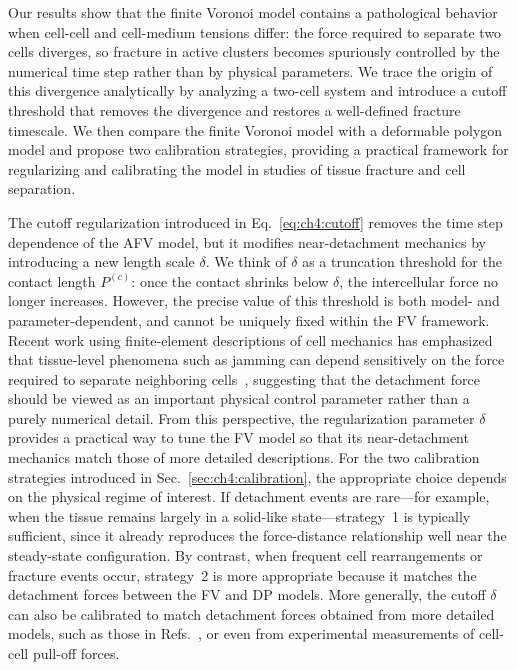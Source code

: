 Our results show that the finite Voronoi model contains a pathological behavior when cell-cell and cell-medium tensions differ: the force required to separate two cells diverges, so fracture in active clusters becomes spuriously controlled by the numerical time step rather than by physical parameters.
We trace the origin of this divergence analytically by analyzing a two-cell system and introduce a cutoff threshold that removes the divergence and restores a well-defined fracture timescale. We then compare the finite Voronoi model with a deformable polygon model and propose two calibration strategies, providing a practical framework for regularizing and calibrating the model in studies of tissue fracture and cell separation.

The cutoff regularization introduced in Eq.~\eqref{eq:ch4:cutoff} removes the time step dependence of the AFV model, but it modifies near-detachment mechanics by introducing a new length scale $\delta$.
We think of $\delta$ as a truncation threshold for the contact length $P^{(c)}$: once the contact shrinks below $\delta$, the intercellular force no longer increases.
However, the precise value of this threshold is both model- and parameter-dependent, and cannot be uniquely fixed within the FV framework.
Recent work using finite-element descriptions of cell mechanics has emphasized that tissue-level phenomena such as jamming can depend sensitively on the force required to separate neighboring cells~\cite{vangheel2026rigidity}, suggesting that the detachment force should be viewed as an important physical control parameter rather than a purely numerical detail.
From this perspective, the regularization parameter $\delta$ provides a practical way to tune the FV model so that its near-detachment mechanics match those of more detailed descriptions.
For the two calibration strategies introduced in Sec.~\ref{sec:ch4:calibration}, the appropriate choice depends on the physical regime of interest.
If detachment events are rare---for example, when the tissue remains largely in a solid-like state---strategy~1 is typically sufficient, since it already reproduces the force-distance relationship well near the steady-state configuration.
By contrast, when frequent cell rearrangements or fracture events occur, strategy~2 is more appropriate because it matches the detachment forces between the FV and DP models.
More generally, the cutoff $\delta$ can also be calibrated to match detachment forces obtained from more detailed models, such as those in Refs.~\cite{boromand2018jamming, lv2024active}, or even from experimental measurements of cell-cell pull-off forces.

